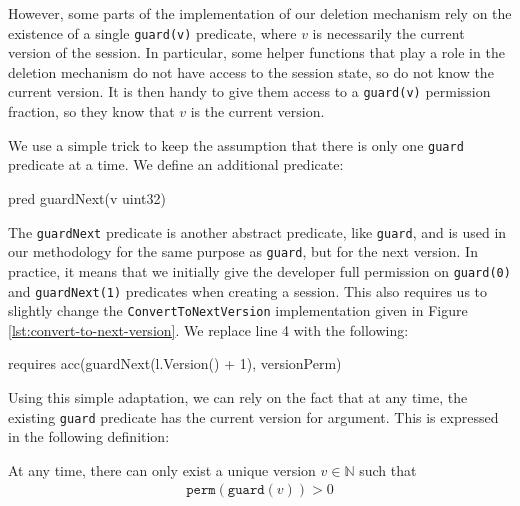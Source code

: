 However, some parts of the implementation of our deletion mechanism rely on the existence of a single \texttt{guard(v)} predicate, where $v$ is necessarily the current version of the session.
In particular, some helper functions that play a role in the deletion mechanism do not have access to the session state, so do not know the current version.
It is then handy to give them access to a \texttt{guard(v)} permission fraction, so they know that $v$ is the current version.

We use a simple trick to keep the assumption that there is only one \texttt{guard} predicate at a time. We define an additional predicate:
\begin{gobra}
pred guardNext(v uint32)
\end{gobra}

The \texttt{guardNext} predicate is another abstract predicate, like \texttt{guard}, and is used in our methodology for the same purpose as \texttt{guard}, but for the next version. 
In practice, it means that we initially give the developer full permission on \texttt{guard(0)} and \texttt{guardNext(1)} predicates when creating a session.
This also requires us to slightly change the \texttt{ConvertToNextVersion} implementation given in Figure \ref{lst:convert-to-next-version}.
We replace line 4 with the following:
\begin{gobra}
requires acc(guardNext(l.Version() + 1), versionPerm)
\end{gobra}

Using this simple adaptation, we can rely on the fact that at any time, the existing \texttt{guard} predicate has the current version for argument.
This is expressed in the following definition:

\begin{definition}\label{def:unique-version}
    At any time, there can only exist a unique version $v \in \mathbb{N}$ such that
    \begin{align*}
        \texttt{perm}(\texttt{guard}(v)) > 0
    \end{align*}

\end{definition}

